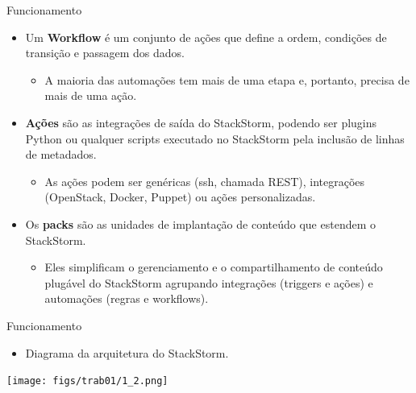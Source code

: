 \documentclass[t,serif]{beamer}
\begin{document}
	\begin{frame}{Funcionamento}
		\begin{itemize}
			\item Um \textbf{Workflow} é um conjunto de ações que define a ordem, condições de transição e passagem dos dados.
			\begin{itemize}
				\item A maioria das automações tem mais de uma etapa e, portanto, precisa de mais de uma ação.
			\end{itemize}
			\item \textbf{Ações} são as integrações de saída do StackStorm, podendo ser plugins Python ou qualquer scripts executado no StackStorm pela inclusão de linhas de metadados.
			\begin{itemize}
				\item As ações podem ser genéricas (ssh, chamada REST), integrações (OpenStack, Docker, Puppet) ou ações personalizadas.
			\end{itemize}
			\item Os \textbf{packs} são as unidades de implantação de conteúdo que estendem o StackStorm.
			 \begin{itemize}
			 	\item Eles simplificam o gerenciamento e o compartilhamento de conteúdo plugável do StackStorm agrupando integrações (triggers e ações) e automações (regras e workflows).
			 \end{itemize}
		\end{itemize}
	\end{frame}
	
	\begin{frame}{Funcionamento}
		\begin{itemize}
			\item Diagrama da arquitetura do StackStorm.
		\end{itemize}
		\begin{center}
			\texttt{[image: figs/trab01/1\_2.png]}
		\end{center}
	\end{frame}
\end{document}
